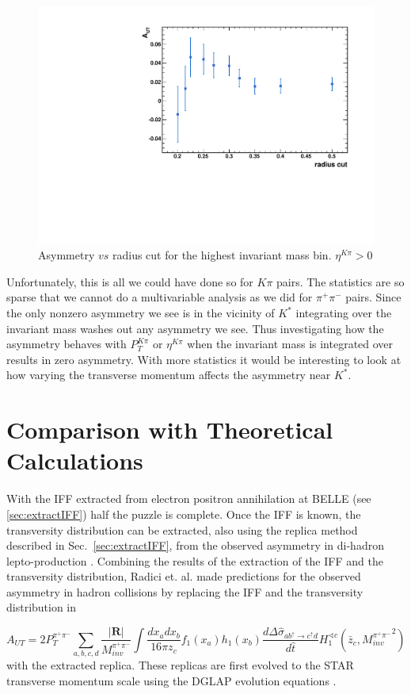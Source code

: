 \documentclass[letterpaper, abstract = on,listof=totoc, bibliography=totoc]{scrreprt}
\newcommand{\ptpair}{P_{T}^{\pi^+\pi^-}}
\newcommand{\mpair}{M_{inv}^{\pi^+\pi^-}}
\newcommand{\pip}{\pi^+}
\newcommand{\pim}{\pi^-}
\newcommand{\pair}{$\pip\pim$ }
\newcommand{\etakp}{\eta^{K\pi}}
\newcommand{\ptkp}{P_{T}^{K\pi}}
\begin{document}
\begin{figure}
\begin{center}
\includegraphics[width = .6\textwidth]{asymVsRadCut}
\caption[]{Asymmetry $vs$ radius cut for the highest invariant mass bin. $\etakp > 0$}
\label{fig:asymVsRadCut}
\end{center}
\end{figure}

Unfortunately, this is all we could have done so for $K\pi$ pairs. The statistics are so sparse that we cannot do a multivariable analysis as we did for \pair pairs. Since the only nonzero asymmetry we see is in the vicinity of $K^*$ integrating over the invariant mass washes out any asymmetry we see. Thus investigating how the asymmetry behaves with $\ptkp$ or $\etakp$ when the invariant mass is integrated over results in zero asymmetry. With more statistics it would be interesting to look at how varying the transverse momentum affects the asymmetry near $K^*$.  

\chapter{Comparison with Theoretical Calculations}

With the IFF extracted from electron positron annihilation at BELLE (see \ref{sec:extractIFF}) half the puzzle is complete. Once the IFF is known, the transversity distribution can be extracted, also using the replica method \cite{extractIFF} described in Sec.~\ref{sec:extractIFF}, from the observed asymmetry in di-hadron lepto-production \cite{RealEstValTrans}. Combining the results of the extraction of the IFF and the transversity distribution, Radici et. al. made predictions for the observed asymmetry in hadron collisions \cite{univTrans} by replacing the IFF and the transversity distribution in

\begin{equation}
\label{eq:crossSecUT_3}
A_{UT} = 2\ptpair \sum_{a,b,c,d} \frac{|\boldsymbol{R}|}{\mpair} \int \frac{dx_a dx_b}{16\pi z_c} f_1(x_a) h_1(x_b) \frac{d\Delta\hat{\sigma}_{a b^\uparrow \rightarrow c^\uparrow d}}{d\hat{t}} H_1^{\sphericalangle c} \left(\bar{z}_c,{\mpair}^2\right) 
\end{equation}
with the extracted replica. These replicas are first evolved to the STAR transverse momentum scale using the DGLAP evolution equations \cite{univTrans}.  
\end{document}
